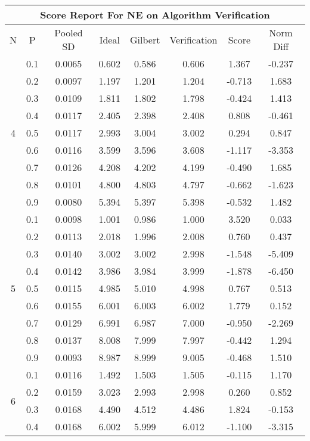 \documentclass[11pt,a4paper]{report}
\begin{document}
\begin{longtable}{ | c | c || c | c | c | c | c | c | }
\hline
\multicolumn{8}{|c|}{ Score Report For NE on Algorithm Verification} \\
\hline
N & P & Pooled SD &  Ideal &  Gilbert & Verification  & Score & Norm Diff \\
 \hline
 \hline
 \endhead
\multirow{9}{*}{4} & 0.1 & 0.0065 & 0.602 & 0.586 & 0.606 & 1.367 & -0.237 \\
 & 0.2 & 0.0097 & 1.197 & 1.201 & 1.204 & -0.713 & 1.683 \\
 & 0.3 & 0.0109 & 1.811 & 1.802 & 1.798 & -0.424 & 1.413 \\
 & 0.4 & 0.0117 & 2.405 & 2.398 & 2.408 & 0.808 & -0.461 \\
 & 0.5 & 0.0117 & 2.993 & 3.004 & 3.002 & 0.294 & 0.847 \\
 & 0.6 & 0.0116 & 3.599 & 3.596 & 3.608 & -1.117 & -3.353 \\
 & 0.7 & 0.0126 & 4.208 & 4.202 & 4.199 & -0.490 & 1.685 \\
 & 0.8 & 0.0101 & 4.800 & 4.803 & 4.797 & -0.662 & -1.623 \\
 & 0.9 & 0.0080 & 5.394 & 5.397 & 5.398 & -0.532 & 1.482 \\
 \hline
\multirow{9}{*}{5} & 0.1 & 0.0098 & 1.001 & 0.986 & 1.000 & 3.520 & 0.033 \\
 & 0.2 & 0.0113 & 2.018 & 1.996 & 2.008 & 0.760 & 0.437 \\
 & 0.3 & 0.0140 & 3.002 & 3.002 & 2.998 & -1.548 & -5.409 \\
 & 0.4 & 0.0142 & 3.986 & 3.984 & 3.999 & -1.878 & -6.450 \\
 & 0.5 & 0.0115 & 4.985 & 5.010 & 4.998 & 0.767 & 0.513 \\
 & 0.6 & 0.0155 & 6.001 & 6.003 & 6.002 & 1.779 & 0.152 \\
 & 0.7 & 0.0129 & 6.991 & 6.987 & 7.000 & -0.950 & -2.269 \\
 & 0.8 & 0.0137 & 8.008 & 7.999 & 7.997 & -0.442 & 1.294 \\
 & 0.9 & 0.0093 & 8.987 & 8.999 & 9.005 & -0.468 & 1.510 \\
 \hline
\multirow{9}{*}{6} & 0.1 & 0.0116 & 1.492 & 1.503 & 1.505 & -0.115 & 1.170 \\
 & 0.2 & 0.0159 & 3.023 & 2.993 & 2.998 & 0.260 & 0.852 \\
 & 0.3 & 0.0168 & 4.490 & 4.512 & 4.486 & 1.824 & -0.153 \\
 & 0.4 & 0.0168 & 6.002 & 5.999 & 6.012 & -1.100 & -3.315 \\

\end{longtable}
\end{document}
